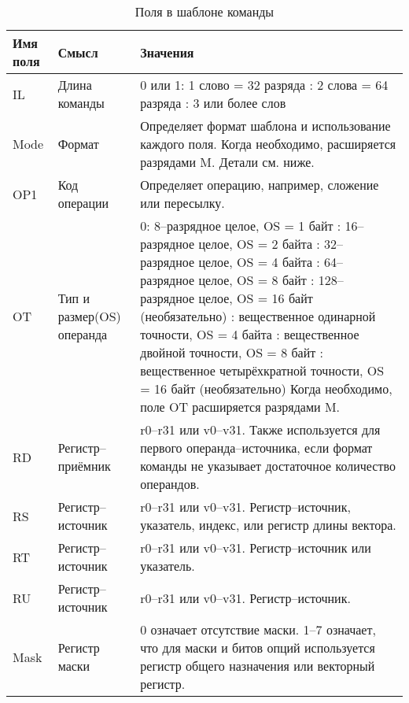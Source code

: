 \documentclass[forwardcom.tex]{subfiles}
\begin{document}
\begin{longtable} {|p{16mm}|p{32mm}|p{101mm}|}
\caption{Поля в шаблоне команды} \label{table:fieldsInTemplates} \\
\endfirsthead
\endhead
\hline
Имя поля & Смысл & Значения  \\
\hline
IL & Длина команды & 0 или 1: 1 слово = 32 разряда \newline
2: 2 слова = 64 разряда \newline
3: 3 или более слов  \\
\hline
Mode & Формат & Определяет формат шаблона и использование каждого поля.
Ког\-да необходимо, расширяется разрядами M. Детали см. ниже. \\ \hline
OP1 & Код операции & Определяет операцию, например, сложение или пересылку.  \\ \hline
OT & Тип и размер\newline (OS) операнда & 
0: 8--разрядное целое, OS = 1 байт  \newline
1: 16--разрядное целое, OS = 2 байта \newline
2: 32--разрядное целое, OS = 4 байта \newline
3: 64--разрядное целое, OS = 8 байт \newline
4: 128--разрядное целое, OS = 16 байт (необязательно) \newline
5: вещественное одинарной точности, OS = 4 байта \newline
6: вещественное двойной точности, OS = 8 байт \newline
7: вещественное четырёхкратной точности, OS = 16 байт (необязательно) \newline
Когда необходимо, поле OT расширяется разрядами M. \\ \hline
RD & Регистр--при\-ём\-ник & r0--r31 или v0--v31. Также используется для первого операнда--источника, если формат команды не указывает достаточное количество операндов. \\ \hline
RS & Регистр--источник & r0--r31 или v0--v31. Регистр--источник, указатель, индекс, или регистр длины вектора. \\ \hline
RT & Регистр--источник & r0--r31 или v0--v31. Регистр--источник или указатель.  \\ \hline
RU & Регистр--источник & r0--r31 или v0--v31. Регистр--источник. \\ \hline
Mask & Регистр маски & 0 означает отсутствие маски. 1--7 означает, что для маски и битов опций используется регистр общего назначения или векторный регистр.  \\ \hline

\end{longtable}
\end{document}
